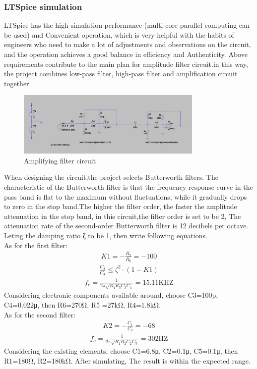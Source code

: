 \subsubsection{LTSpice simulation}
LTSpice has the high simulation performance (multi-core parallel computing can be used) and Convenient operation, which is very helpful with the habits of engineers who need to make a lot of adjustments and observations on the circuit, and the operation achieves a good balance in efficiency and Authenticity.
Above requirements contribute to the main plan for amplitude filter circuit.in this way, the project combines low-pass filter, high-pass filter and amplification circuit together.
\begin{figure}[H]
    \centering
    \includegraphics[width=0.8\textwidth]{figure/Amplifyingfiltercircuit.png}
     \caption{Amplifying filter circuit}
\end{figure}
When designing the circuit,the project selects Butterworth filters.
The characteristic of the Butterworth filter is that the frequency response curve in the pass band is flat to the maximum without fluctuations, while it gradually drops to zero in the stop band.The higher the filter order, the faster the amplitude attenuation in the stop band, in this circuit,the filter order is set to be 2, The attenuation rate of the second-order Butterworth filter is 12 decibels per octave.
Leting the damping ratio ζ to be 1, then write following equations. \\As for the first filter:
\begin{align}
K 1=-\frac{R_{5}}{R_{6}}=-100
\end{align}
\begin{align}
\frac{C_{3}}{C_{4}} \leq \zeta^{2}\cdot(1-K 1)
\end{align}
\begin{align}
f_{c}=\frac{1}{2 \pi \sqrt{R_{4} R_{5} C_{3} C_{4}}}=15.11 \mathrm{KHZ}
\end{align}
Considering electronic components available around, choose C3=100p, C4=0.022μ, then R6=270Ω, R5 =27kΩ, R4=1.8kΩ. \\ 
As for the second filter:
\begin{align}
K 2=-\frac{C_{1}}{C_{2}}=-68
\end{align}
\begin{align}
f_{c}=\frac{1}{2 \pi \sqrt{R_{1} R_{2} C_{2} C_{5}}}=302 \mathrm{HZ}
\end{align}
Considering the existing elements, choose C1=6.8μ, C2=0.1μ, C5=0.1μ, then R1=180Ω, R2=180kΩ.
After simulating,  The result is within the expected range.

